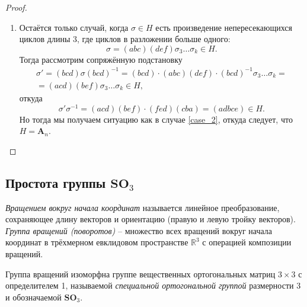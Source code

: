 \documentclass{article}
\begin{document}
\begin{proof}
\begin{enumerate}
        \item Остаётся только случай, когда $\sigma \in H$ есть произведение непересекающихся циклов длины 3, где циклов в разложении больше одного: $$ \sigma = (abc)(def)\sigma_3 \ldots \sigma_k \in H. $$
        Тогда рассмотрим сопряжённую подстановку
        \begin{multline*}
            \sigma' = (bcd) \sigma (bcd)^{-1} = (bcd) \cdot (abc)(def) \cdot (bcd)^{-1} \sigma_3 \ldots \sigma_k = \\
            = (acd)(bef)\sigma_3 \ldots \sigma_k \in H,
        \end{multline*}
        откуда $$ \sigma' \sigma^{-1} = (acd)(bef) \cdot (fed) (cba) = (adbce) \in H. $$ Но тогда мы получаем ситуацию как в случае \ref{case_2}, откуда следует, что $H = \mathbf{A}_n$.
    \end{enumerate}
\end{proof}

\subsection{Простота группы $\textbf{SO}_3$}

\textit{Вращением вокруг начала координат} называется линейное преобразование, сохраняющее длину векторов и ориентацию (правую и левую тройку векторов).
\textit{Группа вращений (поворотов)} -- множество всех вращений вокруг начала координат в трёхмерном евклидовом пространстве $\mathbb{R}^3$ с операцией композиции вращений.

Группа вращений изоморфна группе вещественных ортогональных матриц $3 \times 3$ с определителем 1, называемой \textit{специальной ортогональной группой} размерности 3 и обозначаемой $\mathbf{SO}_3$.
\end{document}
